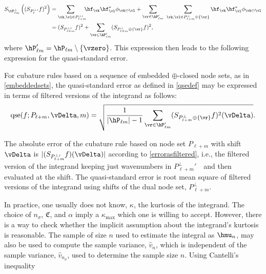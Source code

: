 \documentclass[graybox]{svmult}
\newcommand{\hv}{\hat{v}}
\newcommand{\fudge}{\mathfrak{C}}
\DeclareMathOperator{\qse}{qse}
\begin{document}
\begin{align*}
S_{\tP_{\ell m}^{\perp}}\left( (S_{P_{\ell}^{\perp}{}'}f)^2 \right) &
= \sum_{\vk,\vl \in P_{\ell+m}^{\perp}\!\!\!\!\!\!{}'}  \hf_{\vk} \hf_{\vl}^* \phi_{\vk \ominus \vl} + \sum_{\vr \in \hP_{\ell m}'} \ \sum_{\vk,\vl \in P_{\ell+m}^{\perp} \oplus \{\vr\} } \hf_{\vk} \hf_{\vl}^* \phi_{\vk \ominus \vl} \\
& = (S_{P_{\ell+m}^{\perp}\!\!\!\!\!\!{}'}\ \, f)^2 + \sum_{\vr \in \hP_{\ell m}'} (S_{P_{\ell+m}^{\perp} \oplus \{\vr\}}f)^2,
\end{align*}
where $\hP_{\ell m}' = \hP_{\ell m} \setminus \{\vzero\}$.  This expression then leads to the following expression for the quasi-standard error.

\begin{lemma} \label{qselemma} For cubature rules based on a sequence of embedded  $\oplus$-closed node sets, as in \eqref{embeddedsets}, the quasi-standard error as defined in \eqref{qsedef} may be expressed in terms of filtered versions of the integrand as follows:
\[
\qse(f;P_{\ell+m},\vDelta,m) = \sqrt{\frac{1}{\lvert \hP_{\ell m} \rvert -1} \sum_{\vr \in \hP_{\ell m}'} (S_{P_{\ell+m}^{\perp} \oplus \{\vr\}}f)^2(\vDelta)} .
\]
\end{lemma}

The absolute error of the cubature rule based on node set $P_{\ell+m}$ with shift $\vDelta$ is $\lvert(S_{P_{\ell+m}^{\perp}\!\!\!\!\!\!{}'}\ \, f)(\vDelta)\rvert$ according to \eqref{errorasfiltered}, i.e., the filtered version of the integrand keeping just wavenumbers in $P_{\ell+m}^{\perp}\!\!\!\!\!\!{}'$\ \,  and then evaluated at the shift. The quasi-standard error is root mean square of filtered versions of the integrand using shifts of the dual node set, $P_{\ell+m}^{\perp}$.





In practice, one usually does not know, $\kappa$, the kurtosis of the integrand. The choice of $n_{\sigma}$, $\fudge$, and $\alpha$ imply a $\kappa_{\max}$ which one is willing to accept.  However, there is a way to check whether the implicit assumption about the integrand's kurtosis is reasonable.  The sample of size $n$ used to estimate the integral as $\hmu_n$, may also be used to compute the sample variance, $\hv_n$, which is independent of the sample variance, $\hv_{n_{\sigma}}$, used to determine the sample size $n$. Using Cantelli's inequality
\end{document}
